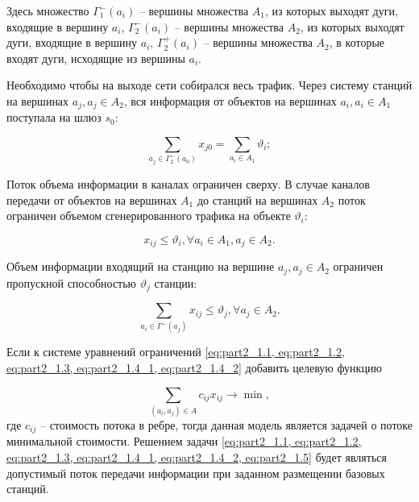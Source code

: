 Здесь множество $\Gamma_1^-(a_i)$ – вершины множества $A_1$, из которых выходят дуги, входящие в вершину $a_i$, $\Gamma_2^-(a_i)$ – вершины множества $A_2$, из которых выходят дуги, входящие в  вершину $a_i$, $\Gamma_2^+(a_i)$ – вершины множества $A_2$, в которые входят дуги, исходящие из вершины $a_i$.


Необходимо чтобы на выходе сети собирался весь трафик. Через систему станций на вершинах $a_j, a_j \in A_2$, вся информация от объектов на вершинах $a_i, a_i \in A_1$ поступала  на шлюз $s_0$:

\begin{equation}\label{eq:part2_1.3}
    \sum_{a_j \in \Gamma_2^-(a_0)} x_{j0} =  \sum_{a_i \in A_1} \vartheta_i;
\end{equation}


Поток объема информации в каналах ограничен сверху. В случае каналов передачи от объектов на вершинах $A_1$ до станций на вершинах $A_2$ поток ограничен объемом сгенерированного трафика на объекте $\vartheta_i$:



\begin{equation}\label{eq:part2_1.4_1}
    x_{ij} \leqslant \vartheta_i, \forall a_i \in A_1, a_j \in A_2.
\end{equation}


Объем информации входящий на станцию на вершине $a_j, a_j \in A_2$ ограничен пропускной способностью $\vartheta_j$ станции: 


\begin{equation}\label{eq:part2_1.4_2}
    \sum_{a_i \in \Gamma^-(a_j)} x_{ij} \leqslant \vartheta_j, \forall a_j \in A_2.
\end{equation}


Если к системе уравнений ограничений \cref{eq:part2_1.1, eq:part2_1.2, eq:part2_1.3, eq:part2_1.4_1, eq:part2_1.4_2} добавить целевую функцию

\begin{equation}
    \label{eq:part2_1.5}
    \sum_{(a_i, a_j) \in A} c_{ij} x_{ij} \rightarrow \min ,
\end{equation}
где $c_{ij}$ -- стоимость потока в ребре, тогда данная модель является задачей о потоке минимальной стоимости. Решением задачи \cref{eq:part2_1.1, eq:part2_1.2, eq:part2_1.3, eq:part2_1.4_1, eq:part2_1.4_2, eq:part2_1.5} будет являться допустимый поток передачи информации при заданном размещении базовых станций.





